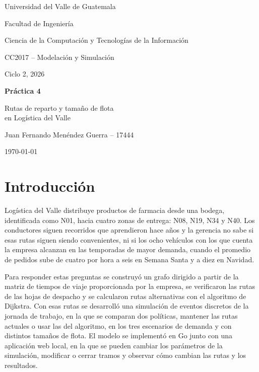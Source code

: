 \documentclass[11pt,letterpaper]{article}
\begin{document}
\spanishplainpercent

\begin{titlepage}
  \centering
  {\large Universidad del Valle de Guatemala\par}
  Facultad de Ingeniería\par
  Ciencia de la Computación y Tecnologías de la Información\par
  CC2017 -- Modelación y Simulación\par
  Ciclo 2, 2026\par
  \vspace{5cm}
  {\LARGE\bfseries Práctica 4\par}
  \vspace{0.5cm}
  {\Large Rutas de reparto y tamaño de flota\\ en Logística del Valle\par}
  \vspace{5cm}
  {\large Juan Fernando Menéndez Guerra -- 17444\par}
  \vfill
  {\today\par}
\end{titlepage}

\section{Introducción}

Logística del Valle distribuye productos de farmacia desde una bodega, identificada como N01, hacia cuatro zonas de entrega: N08, N19, N34 y N40. Los conductores siguen recorridos que aprendieron hace años y la gerencia no sabe si esas rutas siguen siendo convenientes, ni si los ocho vehículos con los que cuenta la empresa alcanzan en las temporadas de mayor demanda, cuando el promedio de pedidos sube de cuatro por hora a seis en Semana Santa y a diez en Navidad.

Para responder estas preguntas se construyó un grafo dirigido a partir de la matriz de tiempos de viaje proporcionada por la empresa, se verificaron las rutas de las hojas de despacho y se calcularon rutas alternativas con el algoritmo de Dijkstra. Con esas rutas se desarrolló una simulación de eventos discretos de la jornada de trabajo, en la que se comparan dos políticas, mantener las rutas actuales o usar las del algoritmo, en los tres escenarios de demanda y con distintos tamaños de flota. El modelo se implementó en Go junto con una aplicación web local, en la que se pueden cambiar los parámetros de la simulación, modificar o cerrar tramos y observar cómo cambian las rutas y los resultados.
\end{document}
